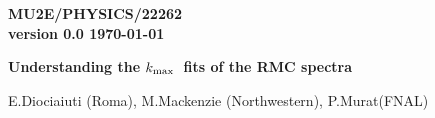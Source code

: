 \documentclass[12pt]{article}
\newcommand {\kmax}         {\mbox{$k_{\rm max}$}}
\newcommand {\MuMinusEPlus} {\mbox{$\mu^- \rightarrow e^+$}}
\begin{document}
\begin{titlepage}
  \begin{flushright}
    \bf {MU2E/PHYSICS/22262} \\
    version 0.0
    \today
  \end{flushright}

  \vspace{1cm}
  
  \begin{center}
    {\Large \bf Understanding the \kmax\ fits of the RMC spectra} 
    
    \vspace{1cm}
    
    E.Diociaiuti (Roma), M.Mackenzie (Northwestern), P.Murat(FNAL)
    
    \vspace{0.3cm}
    
    \vspace{0.8cm}                           
  \end{center}

  \begin{abstract}

    This note summarizes our effort to understand published results on kMax fits
    of the RMC spectra. 
%
    We conclude that internal inconsistencies found in the literature make
    it difficult to rely on the results of other experiments when predicting RMC
    background to the search of \MuMinusEPlus\ conversion process.
    
    To reliably predict RMC background to  \MuMinusEPlus, Mu2e needs to have its own
    measurement of the endpoint of the RMC photon spectrum on Al.
    
  \end{abstract}

\end{titlepage}
%
%
%
{\tableofcontents}

\end{document}
